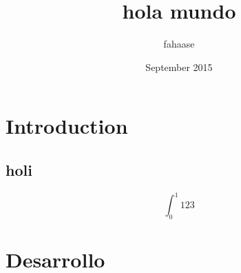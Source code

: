 \documentclass{article}
\title{hola mundo}
\author{fahaase }
\date{September 2015}
\begin{document}
\section{Introduction}
\subsection {holi}
$$\int_{0}^{1} {123}$$
\section{Desarrollo}
\end{document}
